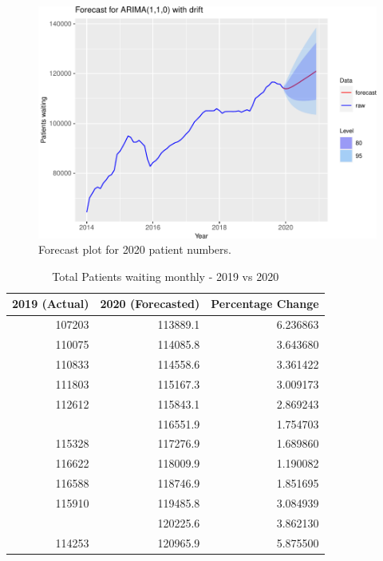 \documentclass[
  12pt,
]{article}
\begin{document}
\begin{figure}

{\centering \includegraphics[width=0.7\linewidth]{data_science_ca4_files/figure-latex/forecast2-1} 

}

\caption{Forecast plot for 2020 patient numbers.}\label{fig:forecast2}
\end{figure}

\begin{table}

\caption{\label{tab:forecast-2020}Total Patients waiting monthly - 2019 vs 2020}
\centering
\fontsize{10}{12}\selectfont
\begin{tabular}[t]{rrr}
\toprule
2019 (Actual) & 2020 (Forecasted) & Percentage Change\\
\midrule
107203 & 113889.1 & 6.236863\\
110075 & 114085.8 & 3.643680\\
110833 & 114558.6 & 3.361422\\
111803 & 115167.3 & 3.009173\\
112612 & 115843.1 & 2.869243\\
\addlinespace
114542 & 116551.9 & 1.754703\\
115328 & 117276.9 & 1.689860\\
116622 & 118009.9 & 1.190082\\
116588 & 118746.9 & 1.851695\\
115910 & 119485.8 & 3.084939\\
\addlinespace
115755 & 120225.6 & 3.862130\\
114253 & 120965.9 & 5.875500\\
\bottomrule
\end{tabular}
\end{table}
\end{document}
